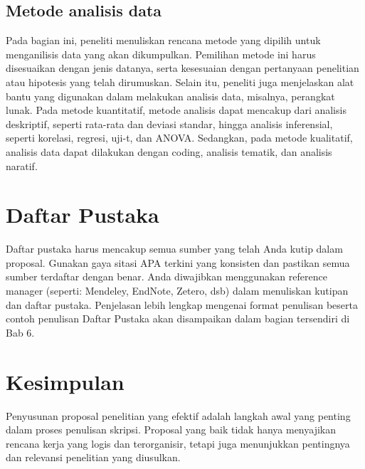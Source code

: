 \documentclass[
  indonesian,
  letterpaper,
]{scrbook}
\begin{document}
\subsection{Metode analisis data}\label{metode-analisis-data}

Pada bagian ini, peneliti menuliskan rencana metode yang dipilih untuk
menganilisis data yang akan dikumpulkan. Pemilihan metode ini harus
disesuaikan dengan jenis datanya, serta kesesuaian dengan pertanyaan
penelitian atau hipotesis yang telah dirumuskan. Selain itu, peneliti
juga menjelaskan alat bantu yang digunakan dalam melakukan analisis
data, misalnya, perangkat lunak. Pada metode kuantitatif, metode
analisis dapat mencakup dari analisis deskriptif, seperti rata-rata dan
deviasi standar, hingga analisis inferensial, seperti korelasi, regresi,
uji-t, dan ANOVA. Sedangkan, pada metode kualitatif, analisis data dapat
dilakukan dengan coding, analisis tematik, dan analisis naratif.

\section{Daftar Pustaka}\label{daftar-pustaka}

Daftar pustaka harus mencakup semua sumber yang telah Anda kutip dalam
proposal. Gunakan gaya sitasi APA terkini yang konsisten dan pastikan
semua sumber terdaftar dengan benar. Anda diwajibkan menggunakan
reference manager (seperti: Mendeley, EndNote, Zetero, dsb) dalam
menuliskan kutipan dan daftar pustaka. Penjelasan lebih lengkap mengenai
format penulisan beserta contoh penulisan Daftar Pustaka akan
disampaikan dalam bagian tersendiri di Bab 6.

\section*{Kesimpulan}\label{kesimpulan-2}


Penyusunan proposal penelitian yang efektif adalah langkah awal yang
penting dalam proses penulisan skripsi. Proposal yang baik tidak hanya
menyajikan rencana kerja yang logis dan terorganisir, tetapi juga
menunjukkan pentingnya dan relevansi penelitian yang diusulkan.


\backmatter
\end{document}
